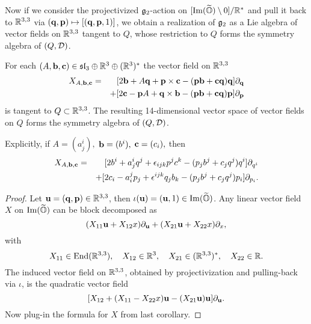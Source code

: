 \sn


 

Now if we consider  the projectivized ${\mathfrak{g}}_2$-action on $[{\rm Im}(\widetilde{\mathbb O})\setminus 0]/\mathbb{R}^*$ and pull it back to $\mathbb{R}^{3,3}$ via $(\mathbf q,{\mathbf p})\mapsto [(\mathbf q,{\mathbf p}, 1)]$, we obtain a realization of ${\mathfrak{g}}_2$ as a Lie algebra of vector fields on $\mathbb{R}^{3,3}$ tangent to $Q$, whose restriction to $Q$ forms the  symmetry algebra of $(Q,{\mathcal D})$. 

\begin{cor}\label{cor3} For  each  $(A,{\bf b}, {\bf c})\in\mathfrak{sl}_3\oplus  \mathbb{R}^3\oplus(\mathbb{R}^3)^*$  the vector field   on $\mathbb{R}^{3,3}$  
\begin{eqnarray*}
X_{A,{\bf b}, {\bf c}}&=&[ 2{\bf b} + A\mathbf q  + {\mathbf p}\times{\bf c}-({\mathbf p}{\bf b}+{\bf c} \mathbf q)\mathbf q]\partial_\mathbf q 
\\ &&
+[2{\bf c}-{\mathbf p} A  + \mathbf q\times{\bf b}-({\mathbf p}{\bf b}+{\bf c}\mathbf q){\mathbf p}]\partial_{{\mathbf p} }
\end{eqnarray*}
is tangent to $Q\subset\mathbb{R}^{3,3}$. The resulting 14-dimensional vector space of vector fields on  $Q$  forms the  symmetry algebra of $(Q,{\mathcal D})$. 
\end{cor}

Explicitly, if  $A=(a^i_j), $ ${\bf b}=(b^i),$  ${\bf c}=(c_i), $ then 
\begin{eqnarray*}
X_{A,{\bf b}, {\bf c}}&=&[ 2b^i + a^i_jq^j + \epsilon_{ijk}p^j c^k -(p_jb^j+ c_j q^j)q^i]\partial_{q^i} 
\\ &&
+[2c_i-a_i^jp_j  + \epsilon^{ijk}q_j b_k- (p_j b^j +c_j q^j )p_i]\partial_{p_i }.
\end{eqnarray*}

\begin{proof} Let ${\bf u}=(\mathbf q,{\mathbf p})\in\mathbb{R}^{3,3}$, then $\iota({\bf u})=({\bf u},1)\in{\rm Im}(\widetilde{\mathbb O})$. Any  linear vector field $X$ on ${\rm Im}(\widetilde{\mathbb O})$ can be block decomposed as $$(X_{11}{\bf u}+ X_{12}x)\partial_{\bf u} + (X_{21}{\bf u}+ X_{22}x)\partial_x,$$ with 
$$X_{11}\in{\rm End}(\mathbb{R}^{3,3}), \quad X_{12}\in\mathbb{R}^3, \quad X_{21}\in(\mathbb{R}^{3,3})^*, \quad X_{22}\in\mathbb{R}.$$
The induced vector field on $\mathbb{R}^{3,3}$, obtained by  projectivization and pulling-back via $\iota$, is the quadratic vector field 
$$[X_{12} + (X_{11}-X_{22}x){\bf u}-(X_{21}{\bf u}){\bf u}]\partial_{\bf u}.$$
%
Now plug-in the formula for $X$ from last corollary. 
\end{proof}








